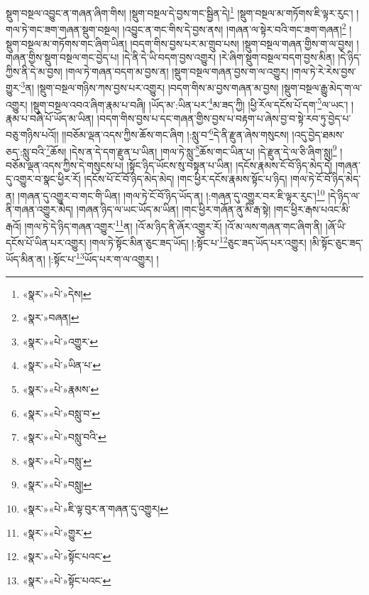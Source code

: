 སྡུག་བསྔལ་འབྱུང་ན་གཞན་ཞིག་གིས། །སྡུག་བསྔལ་དེ་བྱས་གང་སྦྱིན་དེ།\footnote{«སྣར་»«པེ་»དེས།} །སྡུག་བསྔལ་མ་གཏོགས་ཇི་ལྟར་རུང་། །གལ་ཏེ་གང་ཟག་གཞན་སྡུག་བསྔལ། །འབྱུང་ན་གང་གིས་དེ་བྱས་ནས། །གཞན་ལ་སྟེར་བའི་གང་ཟག་གཞན།\footnote{«སྣར་»བཞན།} །སྡུག་བསྔལ་མ་གཏོགས་གང་ཞིག་ཡིན། །བདག་གིས་བྱས་པར་མ་གྲུབ་པས། །སྡུག་བསྔལ་གཞན་གྱིས་ག་ལ་བྱས། །གཞན་གྱིས་སྡུག་བསྔལ་གང་བྱེད་པ། །དེ་ནི་དེ་ཡི་བདག་བྱས་འགྱུར། །རེ་ཞིག་སྡུག་བསྔལ་བདག་བྱས་མིན། །དེ་ཉིད་ཀྱིས་ནི་དེ་མ་བྱས། །གལ་ཏེ་གཞན་བདག་མ་བྱས་ན། །སྡུག་བསྔལ་གཞན་བྱས་ག་ལ་འགྱུར། །གལ་ཏེ་རེ་རེས་བྱས་གྱུར་\footnote{«སྣར་»«པེ་»འགྱུར་}ན། །སྡུག་བསྔལ་གཉིས་ཀས་བྱས་པར་འགྱུར། །བདག་གིས་མ་བྱས་གཞན་མ་བྱས། །སྡུག་བསྔལ་རྒྱུ་མེད་ག་ལ་འགྱུར། །སྡུག་བསྔལ་འབའ་ཞིག་རྣམ་པ་བཞི། །ཡོད་མ་:ཡིན་པར་\footnote{«སྣར་»«པེ་»ཡིན་པ་}མ་ཟད་ཀྱི། །ཕྱི་རོལ་དངོས་པོ་དག་\footnote{«སྣར་»«པེ་»རྣམས་}ལ་ཡང་། །རྣམ་པ་བཞི་པོ་ཡོད་མ་ཡིན། །བདག་གིས་བྱས་པ་དང་གཞན་གྱིས་བྱས་པ་བརྟག་པ་ཞེས་བྱ་བ་སྟེ་རབ་ཏུ་བྱེད་པ་བཅུ་གཉིས་པའོ།། །།བཅོམ་ལྡན་འདས་ཀྱིས་ཆོས་གང་ཞིག །:སླུ་བ་\footnote{«སྣར་»«པེ་»བསླུ་བ་}དེ་ནི་རྫུན་ཞེས་གསུངས། །འདུ་བྱེད་ཐམས་ཅད་:སླུ་བའི་\footnote{«སྣར་»«པེ་»བསླུ་བའི་}ཆོས། །དེས་ན་དེ་དག་རྫུན་པ་ཡིན། །གལ་ཏེ་སླུ་\footnote{«སྣར་»«པེ་»བསླུ་}ཆོས་གང་ཡིན་པ། །དེ་རྫུན་དེ་ལ་ཅི་ཞིག་སླུ།\footnote{«སྣར་»«པེ་»བསླུ།} །བཅོམ་ལྡན་འདས་ཀྱིས་དེ་གསུངས་པ། །སྟོང་ཉིད་ཡོངས་སུ་བསྟན་པ་ཡིན། །དངོས་རྣམས་ངོ་བོ་ཉིད་མེད་དེ། །གཞན་དུ་འགྱུར་བ་སྣང་ཕྱིར་རོ། །དངོས་པོ་ངོ་བོ་ཉིད་མེད་མེད། །གང་ཕྱིར་དངོས་རྣམས་སྟོང་པ་ཉིད། །གལ་ཏེ་ངོ་བོ་ཉིད་མེད་ན། །གཞན་དུ་འགྱུར་བ་གང་གི་ཡིན། །གལ་ཏེ་ངོ་བོ་ཉིད་ཡོད་ན། །:གཞན་དུ་འགྱུར་བར་ཇི་ལྟར་རུང་།\footnote{«སྣར་»«པེ་»ཇི་ལྟ་བུར་ན་གཞན་དུ་འགྱུར།} །དེ་ཉིད་ལ་ནི་གཞན་འགྱུར་མེད། །གཞན་ཉིད་ལ་ཡང་ཡོད་མ་ཡིན། །གང་ཕྱིར་གཞོན་ནུ་མི་རྒ་སྟེ། །གང་ཕྱིར་རྒས་པའང་མི་རྒའོ། །གལ་ཏེ་དེ་ཉིད་གཞན་འགྱུར་\footnote{«སྣར་»«པེ་»གྱུར་}ན། །འོ་མ་ཉིད་ནི་ཞོར་འགྱུར་རོ། །འོ་མ་ལས་གཞན་གང་ཞིག་ནི། །ཞོ་ཡི་དངོས་པོ་ཡིན་པར་འགྱུར། །གལ་ཏེ་སྟོང་མིན་ཅུང་ཟད་ཡོད། །:སྟོང་པ་\footnote{«སྣར་»«པེ་»སྟོང་པའང་}ཅུང་ཟད་ཡོད་པར་འགྱུར། །མི་སྟོང་ཅུང་ཟད་ཡོད་མིན་ན། །:སྟོང་པ་\footnote{«སྣར་»«པེ་»སྟོང་པའང་}ཡོད་པར་ག་ལ་འགྱུར། །
